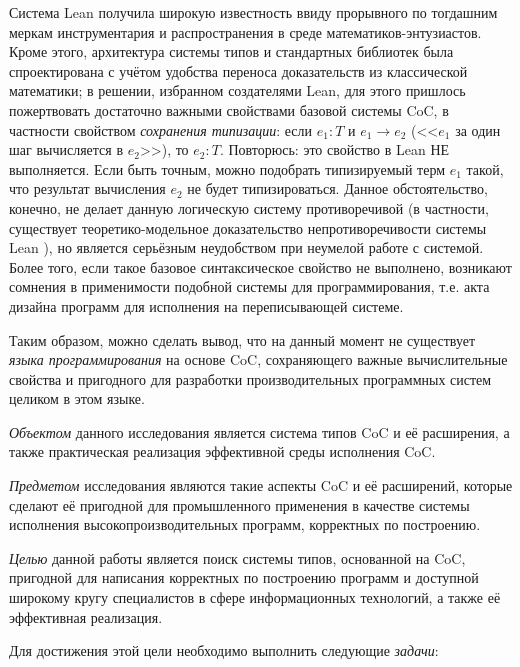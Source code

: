 Система Lean \cite{moura2021lean} получила широкую
известность ввиду прорывного по тогдашним меркам
инструментария и распространения в среде
математиков-энтузиастов. Кроме этого, архитектура системы
типов и стандартных библиотек была спроектирована с учётом
удобства переноса доказательств из классической
математики; в решении, избранном создателями Lean, для
этого пришлось пожертвовать достаточно важными свойствами
базовой системы CoC, в частности свойством
\textit{сохранения типизации}: если $e_1:T$ и $e_1\to e_2$
(<<$e_1$ за один шаг вычисляется в $e_2$>>), то $e_2:T$.
Повторюсь: это свойство в Lean НЕ выполняется. Если быть
точным, можно подобрать типизируемый терм $e_1$ такой, что
результат вычисления $e_2$ не будет типизироваться. Данное
обстоятельство, конечно, не делает данную логическую
систему противоречивой (в частности, существует
теоретико-модельное доказательство непротиворечивости
системы Lean \cite{digama2019leantypetheory}), но является
серьёзным неудобством при неумелой работе с системой.
Более того, если такое базовое синтаксическое свойство не
выполнено, возникают сомнения в применимости подобной
системы для программирования, т.е. акта дизайна программ
для исполнения на переписывающей системе.

Таким образом, можно сделать вывод, что на данный момент
не существует \textit{языка программирования} на основе
CoC, сохраняющего важные вычислительные свойства и
пригодного для разработки производительных программных
систем целиком в этом языке.


\textit{Объектом} данного исследования является система
типов CoC и её расширения, а также практическая реализация
эффективной среды исполнения CoC.

\textit{Предметом} исследования являются такие аспекты CoC
и её расширений, которые сделают её пригодной для
промышленного применения в качестве системы исполнения
высокопроизводительных программ, корректных по построению.


\textit{Целью} данной работы является поиск системы типов,
основанной на CoC, пригодной для написания корректных по
построению программ и доступной широкому кругу
специалистов в сфере информационных технологий, а также её
эффективная реализация.

Для достижения этой цели необходимо выполнить следующие
\textit{задачи}:

